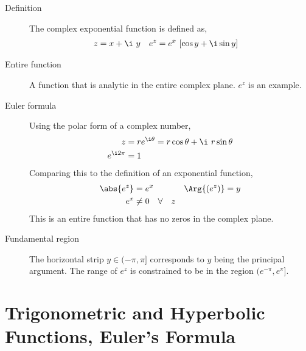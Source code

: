 \begin{description}
    \item[Definition] The complex exponential function is defined as,
        \begin{align}
            z & = x + \i\ y & e^z & = e^x\ [\cos y + \i \sin y]
        \end{align}

    \item[Entire function] A function that is analytic in the entire complex plane.
        $ e^z $ is an example.

    \item[Euler formula] Using the polar form of a complex number,
        \begin{align}
            z           & = re^{\i \theta} = r\cos\theta + \i\ r\sin\theta \\
            e^{\i 2\pi} & = 1
        \end{align}
        Comparing this to the definition of an exponential function,
        \begin{align}
            \abs{e^z}   & = e^x                        &
            \Arg{(e^z)} & = y                            \\
            e^x         & \neq 0 \quad \forall \quad z
        \end{align}
        This is an entire function that has no zeros in the complex plane.

    \item[Fundamental region] The horizontal strip $ y \in (-\pi, \pi] $
        corresponds to $ y $ being the principal argument. The range of $ e^z $ is
        constrained to be in the region $(e^{-\pi}, e^{\pi}]$.
\end{description}

\section{Trigonometric and Hyperbolic Functions, Euler's Formula}

